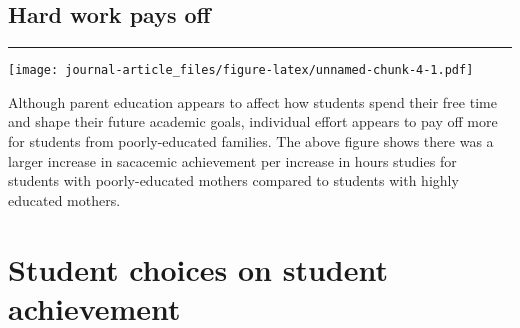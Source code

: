\documentclass[
]{article}
\newenvironment{Shaded}{\begin{snugshade}}{\end{snugshade}}
\newcommand{\DataTypeTok}[1]{\textcolor[rgb]{0.13,0.29,0.53}{#1}}
\newcommand{\DecValTok}[1]{\textcolor[rgb]{0.00,0.00,0.81}{#1}}
\newcommand{\KeywordTok}[1]{\textcolor[rgb]{0.13,0.29,0.53}{\textbf{#1}}}
\newcommand{\NormalTok}[1]{#1}
\newcommand{\OperatorTok}[1]{\textcolor[rgb]{0.81,0.36,0.00}{\textbf{#1}}}
\newcommand{\StringTok}[1]{\textcolor[rgb]{0.31,0.60,0.02}{#1}}
\begin{document}
\hypertarget{hard-work-pays-off}{%
\subsection{Hard work pays off}\label{hard-work-pays-off}}

\begin{center}\rule{0.5\linewidth}{0.5pt}\end{center}

\begin{Shaded}
\end{Shaded}

\texttt{[image: journal-article\_files/figure-latex/unnamed-chunk-4-1.pdf]}

Although parent education appears to affect how students spend their
free time and shape their future academic goals, individual effort
appears to pay off more for students from poorly-educated families. The
above figure shows there was a larger increase in sacacemic achievement
per increase in hours studies for students with poorly-educated mothers
compared to students with highly educated mothers.

\hypertarget{student-choices-on-student-achievement}{%
\section{Student choices on student
achievement}\label{student-choices-on-student-achievement}}
\end{document}
